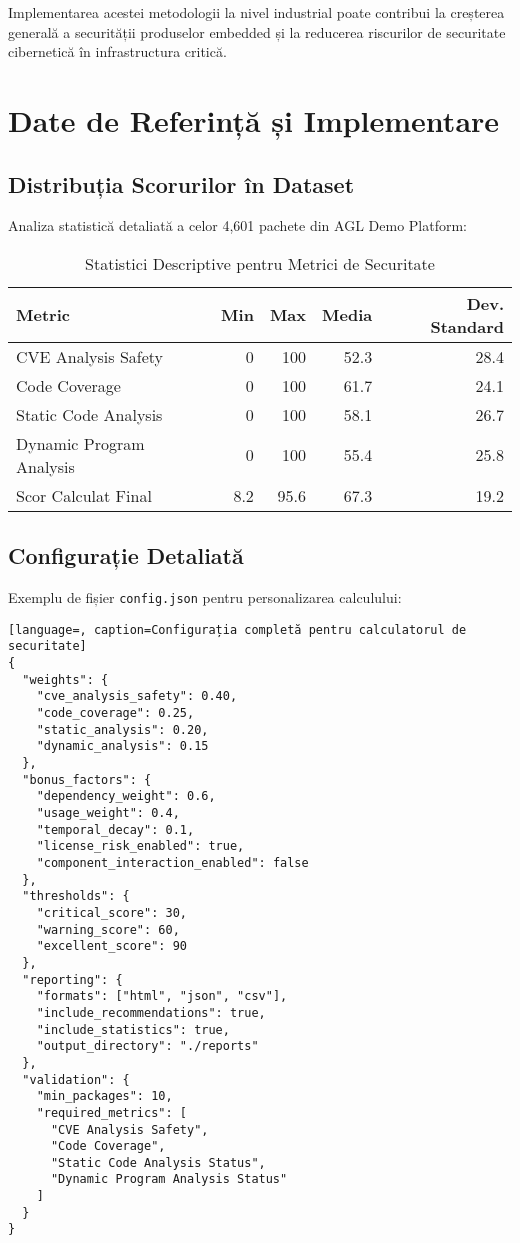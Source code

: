 \documentclass[12pt,a4paper]{article}
\begin{document}
Implementarea acestei metodologii la nivel industrial poate contribui la creșterea generală a securității produselor embedded și la reducerea riscurilor de securitate cibernetică în infrastructura critică.

\newpage

\appendix
\section{Date de Referință și Implementare}

\subsection{Distribuția Scorurilor în Dataset}

Analiza statistică detaliată a celor 4,601 pachete din AGL Demo Platform:

\begin{table}[H]
\centering
\caption{Statistici Descriptive pentru Metrici de Securitate}
\begin{tabular}{@{}lrrrr@{}}
\toprule
\textbf{Metric} & \textbf{Min} & \textbf{Max} & \textbf{Media} & \textbf{Dev. Standard} \\
\midrule
CVE Analysis Safety & 0 & 100 & 52.3 & 28.4 \\
Code Coverage & 0 & 100 & 61.7 & 24.1 \\
Static Code Analysis & 0 & 100 & 58.1 & 26.7 \\
Dynamic Program Analysis & 0 & 100 & 55.4 & 25.8 \\
Scor Calculat Final & 8.2 & 95.6 & 67.3 & 19.2 \\
\bottomrule
\end{tabular}
\end{table}

\subsection{Configurație Detaliată}

Exemplu de fișier \texttt{config.json} pentru personalizarea calculului:

\begin{lstlisting}[language=, caption=Configurația completă pentru calculatorul de securitate]
{
  "weights": {
    "cve_analysis_safety": 0.40,
    "code_coverage": 0.25,
    "static_analysis": 0.20,
    "dynamic_analysis": 0.15
  },
  "bonus_factors": {
    "dependency_weight": 0.6,
    "usage_weight": 0.4,
    "temporal_decay": 0.1,
    "license_risk_enabled": true,
    "component_interaction_enabled": false
  },
  "thresholds": {
    "critical_score": 30,
    "warning_score": 60,
    "excellent_score": 90
  },
  "reporting": {
    "formats": ["html", "json", "csv"],
    "include_recommendations": true,
    "include_statistics": true,
    "output_directory": "./reports"
  },
  "validation": {
    "min_packages": 10,
    "required_metrics": [
      "CVE Analysis Safety",
      "Code Coverage",
      "Static Code Analysis Status",
      "Dynamic Program Analysis Status"
    ]
  }
}
\end{lstlisting}
\end{document}
